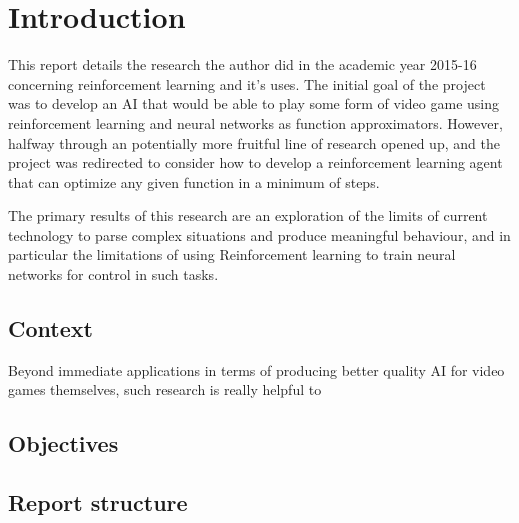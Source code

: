 \section{Introduction}
This report details the research the author did in the academic year 2015-16 concerning reinforcement learning and it's uses. The initial goal of the project was to develop an AI that would be able to play some form of video game using reinforcement learning and neural networks as function approximators. However, halfway through an potentially more fruitful line of research opened up, and the project was redirected to consider how to develop a reinforcement learning agent that can optimize any given function in a minimum of steps.

The primary results of this research are an exploration of the limits of current technology to parse complex situations and produce meaningful behaviour, and in particular the limitations of using Reinforcement learning to train neural networks for control in such tasks.

\subsection{Context}
Beyond immediate applications in terms of producing better quality AI for video games themselves, such research is really helpful to 


\subsection{Objectives}

\subsection{Report structure}

